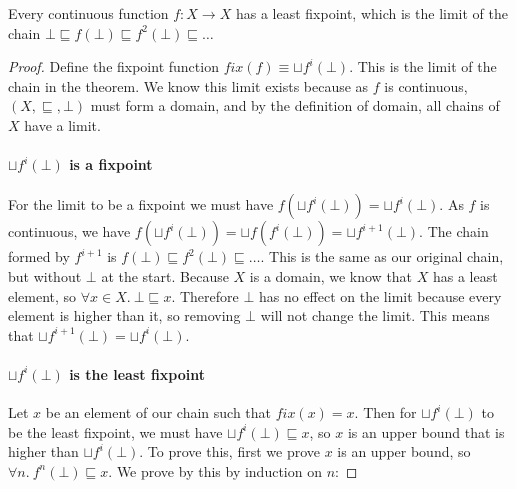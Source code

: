 
\begin{thm}
Every continuous function $f : X \to X$ has a least fixpoint, which is the limit of the chain $\bot \sqsubseteq f(\bot) \sqsubseteq f^2(\bot) \sqsubseteq \dots$
\end{thm}

\vspace{0.5cm}


\begin{proof}
 Define the fixpoint function $fix(f) \equiv \sqcup f^i (\bot)$. This is the limit of the chain in the theorem. We know this limit exists because as $f$ is continuous, $(X, \sqsubseteq, \bot)$ must form a domain, and by the definition of domain, all chains of $X$ have a limit. 



\paragraph{$\sqcup f^i (\bot)$ is a fixpoint}
For the limit to be a fixpoint we must have  $f( \sqcup f^i (\bot)) =  \sqcup f^i (\bot)$.  As $f$ is continuous, we have $f( \sqcup f^i (\bot)) = \sqcup f(f^i(\bot)) = \sqcup f^{i+1}(\bot)$. The chain formed by $f^{i+1}$ is $f(\bot)  \sqsubseteq f^2(\bot) \sqsubseteq \dots$. This is the same as our original chain, but without $\bot$ at the start. Because $X$ is a domain, we know that $X$ has a least element, so $\forall x \in X. \ \bot \sqsubseteq x$. Therefore $\bot$ has no effect on the limit because every element is higher than it, so removing $\bot$ will not change the limit. This means that $\sqcup f^{i+1} (\bot) = \sqcup f^i(\bot)$.

\paragraph{$\sqcup f^i (\bot)$ is the least fixpoint}
Let $x$ be an element of our chain such that $fix(x) = x$. Then for $\sqcup f^i (\bot)$ to be the least fixpoint, we must have $\sqcup f^i (\bot) \sqsubseteq x$, so $x$ is an upper bound that is higher than $\sqcup f^i (\bot)$. To prove this, first we prove $x$ is an upper bound, so  $\forall n. \ f^n(\bot) \sqsubseteq x$. We prove by this by induction on $n$:


\end{proof}
